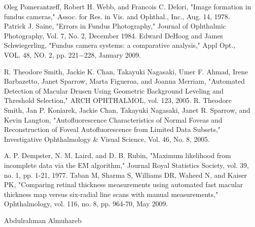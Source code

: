 \begin{thebibliography}{300}
 Oleg Pomerantzeff, Robert H. Webb, and Francois C. Delori, "Image formation in fundus cameras," Assoc. for Res. in Vis. and Ophthal., Inc., Aug. 14, 1978.
 Patrick J. Saine, "Errors in Fundus Photography," Journal of Ophthalmic Photography, Vol. 7, No. 2, December 1984.
 Edward DeHoog and James Schwiegerling, "Fundus camera systems: a comparative analysis," Appl Opt., VOL. 48, NO. 2, pp. 221$-$228, January 2009.

 R. Theodore Smith, Jackie K. Chan, Takayuki Nagasaki, Umer F. Ahmad, Irene Barbazetto, Janet Sparrow, Marta Figueroa, and Joanna Merriam, "Automated Detection of Macular Drusen Using Geometric Background Leveling and Threshold Selection," ARCH OPHTHALMOL, vol. 123, 2005.
 R. Theodore Smith, Jan P. Koniarek, Jackie Chan, Takayuki Nagasaki, Janet R. Sparrow, and Kevin Langton, "Autofluorescence Characteristics of Normal Foveas and Reconstruction of Foveal Autofluorescence from Limited Data Subsets," Investigative Ophthalmology \& Visual Science, Vol. 46, No. 8, 2005.

 A. P. Dempster, N. M. Laird, and D. B. Rubin, "Maximum likelihood from incomplete data via the EM algorithm," Journal Royal Statistics Society, vol. 39, no. 1, pp. 1-21, 1977.
 Taban M, Sharma S, Williams DR, Waheed N, and Kaiser PK, "Comparing retinal thickness measurements using automated fast macular thickness map versus six-radial line scans with manual measurements," Ophthalmology, vol. 116, no. 8, pp. 964-70, May 2009.

Abdulrahman Almuhareb

\end{thebibliography}

%
%
%
%
\newpage
